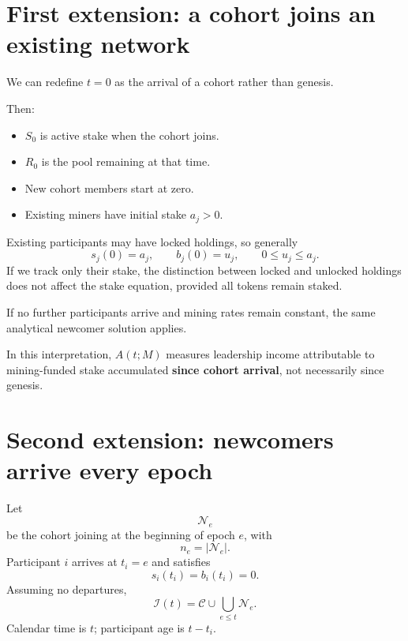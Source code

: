 \documentclass[11pt,a4paper]{article}
\begin{document}


\section{First extension: a cohort joins an existing network}
We can redefine $t=0$ as the arrival of a cohort rather than genesis.

Then:
\begin{itemize}
\item $S_0$ is active stake when the cohort joins.
\item $R_0$ is the pool remaining at that time.
\item New cohort members start at zero.
\item Existing miners have initial stake $a_j>0$.
\end{itemize}
Existing participants may have locked holdings, so generally
\begin{equation}
s_j(0)=a_j,\qquad b_j(0)=u_j,\qquad 0\le u_j\le a_j.
\end{equation}
If we track only their stake, the distinction between locked and unlocked holdings does not affect the stake equation, provided all tokens remain staked.

If no further participants arrive and mining rates remain constant, the same analytical newcomer solution applies.

In this interpretation, $A(t;M)$ measures leadership income attributable to mining-funded stake accumulated \textbf{since cohort arrival}, not necessarily since genesis.

\section{Second extension: newcomers arrive every epoch}
Let
\begin{equation}
\mathcal N_e
\end{equation}
be the cohort joining at the beginning of epoch $e$, with
\begin{equation}
n_e=|\mathcal N_e|.
\end{equation}
Participant $i$ arrives at $t_i=e$ and satisfies
\begin{equation}
\boxed{s_i(t_i)=b_i(t_i)=0.}
\end{equation}
Assuming no departures,
\begin{equation}
\mathcal I(t)=\mathcal C\cup\bigcup_{e\le t}\mathcal N_e.
\end{equation}
Calendar time is $t$; participant age is $t-t_i$.
\end{document}
